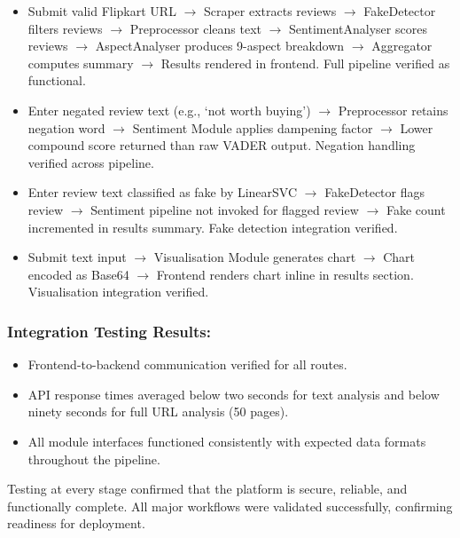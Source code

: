 \documentclass[12pt,a4paper]{report}
\begin{document}
\begin{itemize}
  \item Submit valid Flipkart URL $\rightarrow$ Scraper extracts reviews $\rightarrow$ FakeDetector filters reviews $\rightarrow$ Preprocessor cleans text $\rightarrow$ SentimentAnalyser scores reviews $\rightarrow$ AspectAnalyser produces 9-aspect breakdown $\rightarrow$ Aggregator computes summary $\rightarrow$ Results rendered in frontend. Full pipeline verified as functional.

  \item Enter negated review text (e.g., `not worth buying') $\rightarrow$ Preprocessor retains negation word $\rightarrow$ Sentiment Module applies dampening factor $\rightarrow$ Lower compound score returned than raw VADER output. Negation handling verified across pipeline.

  \item Enter review text classified as fake by LinearSVC $\rightarrow$ FakeDetector flags review $\rightarrow$ Sentiment pipeline not invoked for flagged review $\rightarrow$ Fake count incremented in results summary. Fake detection integration verified.

  \item Submit text input $\rightarrow$ Visualisation Module generates chart $\rightarrow$ Chart encoded as Base64 $\rightarrow$ Frontend renders chart inline in results section. Visualisation integration verified.
\end{itemize}

\subsubsection*{Integration Testing Results:}

\begin{itemize}
  \item Frontend-to-backend communication verified for all routes.
  \item API response times averaged below two seconds for text analysis and below ninety seconds for full URL analysis (50 pages).
  \item All module interfaces functioned consistently with expected data formats throughout the pipeline.
\end{itemize}

Testing at every stage confirmed that the platform is secure, reliable, and functionally complete. All major workflows were validated successfully, confirming readiness for deployment.
\end{document}
